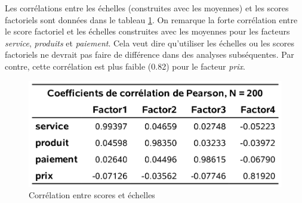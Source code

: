 \documentclass[
]{book}
\theoremstyle{definition}
\theoremstyle{definition}
\theoremstyle{definition}
\theoremstyle{remark}
\begin{document}
Les corrélations entre les échelles (construites avec les moyennes) et les scores factoriels sont données dans le tableau \ref{fig:fig1p16}. On remarque la forte corrélation entre le score factoriel et les échelles construites avec les moyennes pour les facteurs \emph{service}, \emph{produits} et
\emph{paiement}. Cela veut dire qu'utiliser les échelles ou les scores factoriels ne
devrait pas faire de différence dans des analyses subséquentes. Par contre,
cette corrélation est plus faible (0.82) pour le facteur \emph{prix}.

\begin{figure}

{\centering \includegraphics[width=0.65\linewidth]{figures/01-facto-e16} 

}

\caption{Corrélation entre scores et échelles}\label{fig:fig1p16}
\end{figure}

\backmatter
  
\end{document}

